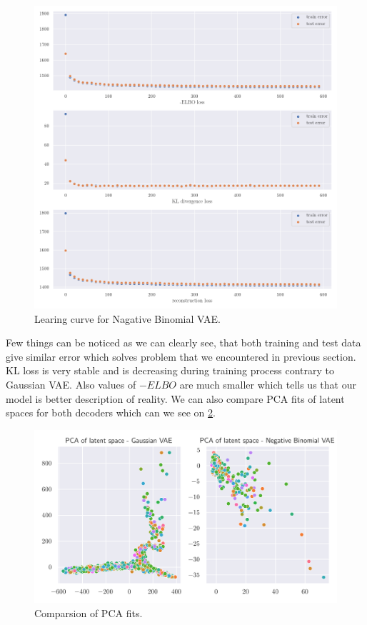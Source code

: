 \documentclass[12pt,a4paper]{article}
\begin{document}
\begin{figure}[H]
    \begin{center}
        \includegraphics[scale=0.4]{src/custom_vae_training_100.png}
    \end{center}
    \caption{Learing curve for Nagative Binomial VAE.}
    \label{fig:binomial_train}
\end{figure}
Few things can be noticed as we can clearly see, that both training and test data give similar error which solves problem that we encountered in previous 
section. KL loss is very stable and is decreasing during training process contrary to Gaussian VAE. Also values of $-ELBO$ are much smaller which tells us 
that our model is better description of reality. We can also compare PCA fits of latent spaces for both decoders which can we see on \ref{fig:compare_pca}.
\begin{figure}[H]
    \begin{center}
        \includegraphics{src/compare.png}
    \end{center}
    \caption{Comparsion of PCA fits.}
    \label{fig:compare_pca}
\end{figure}
\end{document}
